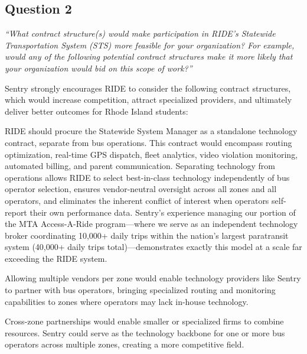 \subsection{Question 2}
\textit{``What contract structure(s) would make participation in RIDE's Statewide Transportation System (STS) more feasible for your organization? For example, would any of the following potential contract structures make it more likely that your organization would bid on this scope of work?''}

\vspace{0.2cm}

Sentry strongly encourages RIDE to consider the following contract structures, which would increase competition, attract specialized providers, and ultimately deliver better outcomes for Rhode Island students:

\begin{description}[style=nextline, leftmargin=0.5cm]
    \item[\faIcon{check-circle} \textbf{Separate Technology / System Management Contract:}] RIDE should procure the Statewide System Manager as a standalone technology contract, separate from bus operations. This contract would encompass routing optimization, real-time GPS dispatch, fleet analytics, video violation monitoring, automated billing, and parent communication. Separating technology from operations allows RIDE to select best-in-class technology independently of bus operator selection, ensures vendor-neutral oversight across all zones and all operators, and eliminates the inherent conflict of interest when operators self-report their own performance data. Sentry's experience managing our portion of the MTA Access-A-Ride program---where we serve as an independent technology broker coordinating 10,000+ daily trips within the nation's largest paratransit system (40,000+ daily trips total)---demonstrates exactly this model at a scale far exceeding the RIDE system.

    \item[\faIcon{check-circle} \textbf{Multiple Vendor Awards per Zone:}] Allowing multiple vendors per zone would enable technology providers like Sentry to partner with bus operators, bringing specialized routing and monitoring capabilities to zones where operators may lack in-house technology.

    \item[\faIcon{check-circle} \textbf{Allowing Subcontracting or Partnerships:}] Cross-zone partnerships would enable smaller or specialized firms to combine resources. Sentry could serve as the technology backbone for one or more bus operators across multiple zones, creating a more competitive field.
\end{description}

